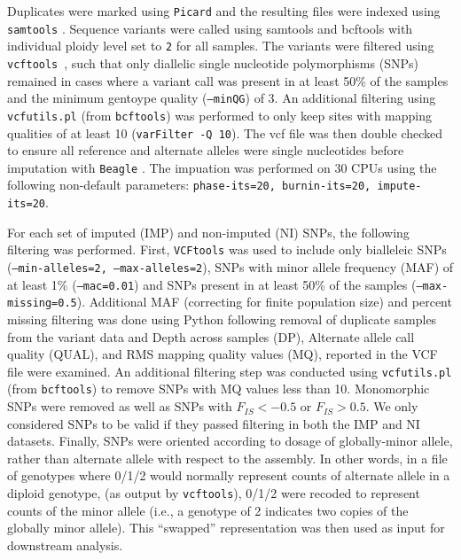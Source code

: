 \documentclass[fleqn,11pt]{wlpeerj}
\begin{document}
Duplicates were marked using \texttt{Picard} and the resulting files were
indexed using \texttt{samtools} \citep[][version 1.2]{Li:2009ka}.  Sequence
variants were called using samtools and bcftools \citep[][version
1.2]{Li:2009ka} with individual  ploidy level set to \texttt{2} for all samples.
The variants were filtered  using \texttt{vcftools}~\citep[][version
0.1.14]{Danecek:2011gz}, such that only diallelic single nucleotide polymorphisms (SNPs) remained in cases where a
variant call was present in at least 50\% of the samples and the minimum
gentoype quality (\texttt{--minQG}) of 3. An additional filtering using
\texttt{vcfutils.pl} (from \texttt{bcftools}) was performed to only keep sites
with mapping qualities of at least 10 (\texttt{varFilter -Q 10}). The vcf file
was then double checked to ensure all reference and alternate alleles were
single nucleotides before imputation with \texttt{Beagle}
\citep[][version 4.0, r1399]{Browning:2007ge}.  The impuation was performed on 30 CPUs
using the following non-default parameters: \texttt{phase-its=20, burnin-its=20,
impute-its=20}.

For each set of imputed (IMP) and non-imputed (NI) SNPs, the following filtering
was performed.  First, \texttt{VCFtools} was used to include only bialleleic
SNPs (\texttt{--min-alleles=2, --max-alleles=2}), SNPs with minor allele
frequency (MAF) of at least 1\% (\texttt{--mac=0.01}) and SNPs present in at
least 50\% of the samples (\texttt{--max-missing=0.5}).  Additional MAF
(correcting for  finite population size) and percent missing filtering was done
using Python following removal of duplicate samples from the variant data and
Depth across samples (DP), Alternate allele call quality (QUAL), and RMS mapping
quality values (MQ), reported in the VCF file were examined.  An additional
filtering step was conducted using \texttt{vcfutils.pl} (from \texttt{bcftools})
to remove SNPs with MQ values less than 10.  Monomorphic SNPs were removed as
well as SNPs with $F_{IS} < -0.5$ or $F_{IS} > 0.5$.  We only considered SNPs
to be valid if they passed filtering in both the IMP and NI datasets. Finally,
SNPs were oriented according to dosage of globally-minor allele, rather than
alternate allele with respect to the assembly. In other words, in a file of
genotypes where 0/1/2 would normally represent counts of alternate allele in a
diploid genotype,  (as output by \texttt{vcftools}), 0/1/2 were recoded to
represent counts of the minor allele (i.e., a genotype of 2 indicates two copies
of the globally minor allele). This ``swapped'' representation was then used as
input for downstream analysis.
\end{document}
